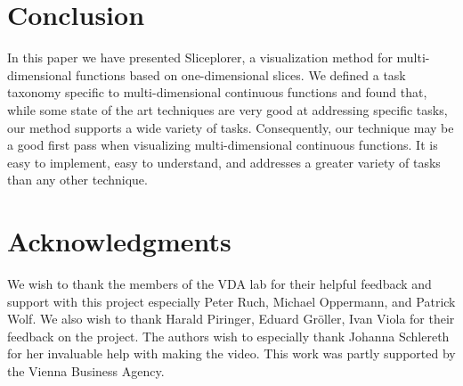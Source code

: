 \section{Conclusion}

In this paper we have presented Sliceplorer, a visualization method for
multi-dimensional functions based on one-dimensional slices. We defined a task
taxonomy specific to multi-dimensional continuous functions and found that,
while some state of the art techniques are very good at  addressing specific
tasks, our method supports a wide variety of tasks. Consequently, our technique
may be a good first pass when visualizing multi-dimensional continuous functions. 
It is easy to implement, easy to understand, and addresses a greater variety
of tasks than any other technique. 

\section*{Acknowledgments}
We wish to thank the members of the VDA lab for their helpful feedback and
support with this project especially Peter Ruch, Michael Oppermann, and
Patrick Wolf. We also wish to thank Harald Piringer, Eduard Gr{\"o}ller, Ivan
Viola for their feedback on the project.  The authors wish to especially
thank Johanna Schlereth for her invaluable help with making the video.
This work was partly supported by the Vienna Business Agency.

